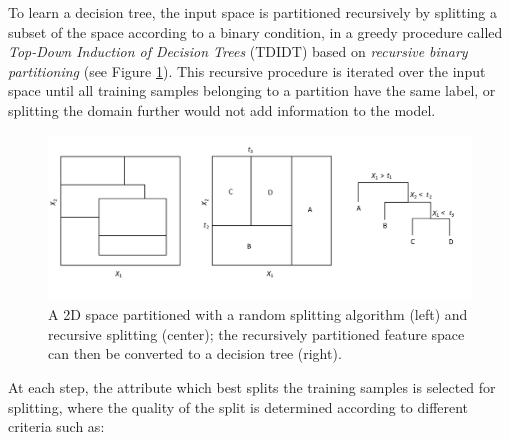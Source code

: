 To learn a decision tree, the input space is partitioned recursively by 
splitting a subset of the space according to a binary condition, in a 
greedy procedure called \textit{Top-Down Induction of Decision Trees} (TDIDT) 
based on \textit{recursive binary partitioning} (see Figure 
\ref{f:recursive_splitting}). 
This recursive procedure is iterated over the input space until all training 
samples belonging to a partition have the same label, or splitting the domain 
further would not add information to the model. 
%
\begin{figure}
    \includegraphics[width=1\textwidth]{pictures/recursive_splitting}
    \centering
    \caption[Recursive binary partitioning]{A 2D space partitioned with a random 
	    splitting algorithm (left) and recursive splitting (center); the 
	    recursively partitioned feature space can then be converted to a 
	    decision tree (right).}
    \label{f:recursive_splitting}
\end{figure}
%
At each step, the attribute which best splits the training samples is selected
for splitting, where the quality of the split is determined according to 
different criteria such as:
